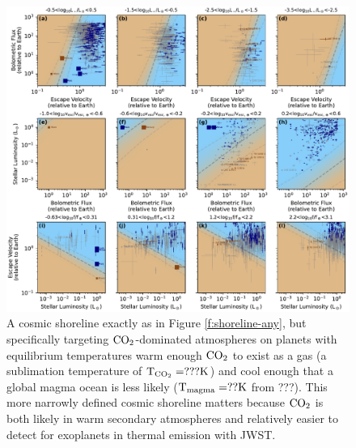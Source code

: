 \documentclass[modern,linenumbers,trackchanges]{aastex7}
\begin{document}
\begin{figure}[ht!]
\includegraphics[width=\textwidth]{figures/grid-of-shorelines-CO2.pdf}
\caption{A cosmic shoreline exactly as in Figure \ref{f:shoreline-any}, but specifically targeting $\rm{CO}_2$-dominated atmospheres on planets with equilibrium temperatures warm enough $\rm{CO_2}$ to exist as a gas (a sublimation temperature of ${\rm T_{CO_2}}= ??? \mathrm{K}$) and cool enough that a global magma ocean is less likely (${\rm T_{magma}} = ?? \mathrm{K}$ from ???). This more narrowly defined cosmic shoreline matters because $\rm CO_2$ is both likely in warm secondary atmospheres and relatively easier to detect for exoplanets in thermal emission with JWST.}
\label{f:shoreline-CO2}
\end{figure}
\end{document}
